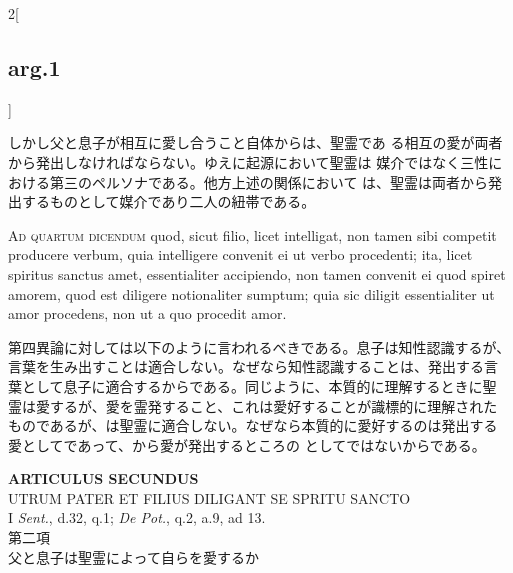 \documentclass[paper=a4paper,fontsize=10pt,jafontsize=9pt,titlepage]{jlreq}
\begin{document}
\begin{paracol}{2}[\subsection{arg.1}]
\switchcolumn

しかし父と息子が相互に愛し合うこと自体からは、聖霊であ
 る相互の愛が両者から発出しなければならない。ゆえに起源において聖霊は
 媒介ではなく三性における第三のペルソナである。他方上述の関係において
 は、聖霊は両者から発出するものとして媒介であり二人の紐帯である。

\switchcolumn*[\subsection{ad.4}]

{\scshape Ad quartum dicendum} quod, sicut filio, licet intelligat, non tamen
sibi competit producere verbum, quia intelligere convenit ei ut verbo
procedenti; ita, licet spiritus sanctus amet, essentialiter
accipiendo, non tamen convenit ei quod spiret amorem, quod est
diligere notionaliter sumptum; quia sic diligit essentialiter ut amor
procedens, non ut a quo procedit amor.

\switchcolumn

第四異論に対しては以下のように言われるべきである。息子は知性認識するが、
言葉を生み出すことは適合しない。なぜなら知性認識することは、発出する言
葉として息子に適合するからである。同じように、本質的に理解するときに聖
霊は愛するが、愛を霊発すること、これは愛好することが識標的に理解された
ものであるが、は聖霊に適合しない。なぜなら本質的に愛好するのは発出する
愛としてであって、から愛が発出するところの
としてではないからである。

\end{paracol}
\newpage




\begin{center}
{\Large {\bfseries ARTICULUS SECUNDUS}}\\
{\large UTRUM PATER ET FILIUS DILIGANT SE SPRITU SANCTO}\\
{\footnotesize I {\itshape Sent.}, d.32, q.1; {\itshape De Pot.}, q.2, a.9, ad 13.}\\
{\Large 第二項\\父と息子は聖霊によって自らを愛するか}
\end{center}


{}
\setcounter{section}{2}
\setcounter{subsection}{0}
\end{document}
